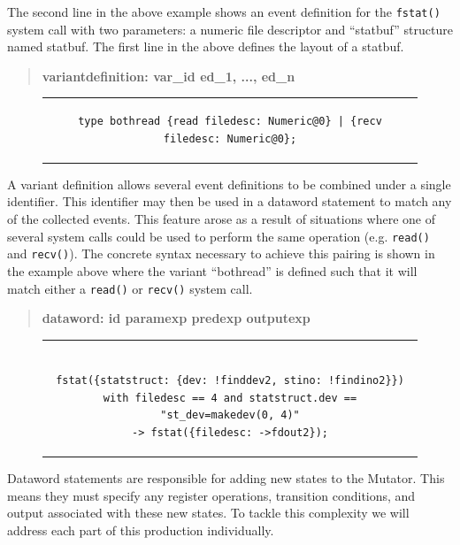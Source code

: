 The second line in the above example shows an event
definition for the {\tt fstat()} system call with two parameters: a numeric
file descriptor and ``statbuf'' structure named statbuf.
The first line in the above defines the layout of a statbuf.


\begin{quote}
\centering
\textbf{variantdefinition: var\_id ed\_1, ..., ed\_n}
\end{quote}

\begin{figure}[H]
\centering
\begin{tabular}{c}
\begin{lstlisting}
type bothread {read filedesc: Numeric@0} | {recv filedesc: Numeric@0};
\end{lstlisting}
\end{tabular}
\end{figure}

A variant definition allows several event definitions to be combined under
a single identifier.  This identifier may then be used in a dataword
statement to match any of the collected events.  This feature arose as a
result of situations where one of several system calls could be used to
perform the same operation (e.g. {\tt read()} and {\tt recv()}).  The
concrete syntax necessary to achieve this pairing is shown in the example
above where the variant ``bothread'' is defined such that it will match
either a {\tt read()} or {\tt recv()} system call.

\begin{quote}
\centering
\textbf{dataword: id paramexp predexp outputexp}
\end{quote}

\begin{figure}[H]
\centering
\begin{tabular}{c}
\begin{lstlisting}

fstat({statstruct: {dev: !finddev2, stino: !findino2}})
with filedesc == 4 and statstruct.dev == "st_dev=makedev(0, 4)"
-> fstat({filedesc: ->fdout2});

\end{lstlisting}
\end{tabular}
\end{figure}

Dataword statements are responsible for adding new states to the
Mutator.  This means they must specify any register operations,
transition conditions, and output associated with these new states.  To
tackle this complexity we will address each part of this production
individually.

